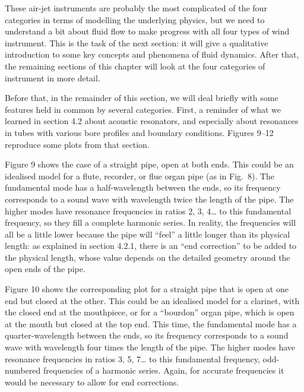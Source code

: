   These air-jet instruments are probably the most complicated of the four 
  categories in terms of modelling the underlying physics, but we need to 
  understand a bit about fluid flow to make progress with all four types of 
  wind instrument. This is the task of the next section: it will give a 
  qualitative introduction to some key concepts and phenomena of fluid 
  dynamics. After that, the remaining sections of this chapter will look at the 
  four categories of instrument in more detail. 


  Before that, in the remainder of this section, we will deal briefly with some 
  features held in common by several categories. First, a reminder of what we 
  learned in section 4.2 about acoustic resonators, and especially about 
  resonances in tubes with various bore profiles and boundary conditions. 
  Figures 9--12 reproduce some plots from that section. 

  Figure 9 shows the case of a straight pipe, open at both ends. This could be 
  an idealised model for a flute, recorder, or flue organ pipe (as in Fig.\ 8). 
  The fundamental mode has a half-wavelength between the ends, so its frequency 
  corresponds to a sound wave with wavelength twice the length of the pipe. The 
  higher modes have resonance frequencies in ratios 2, 3, 4… to this 
  fundamental frequency, so they fill a complete harmonic series. In reality, 
  the frequencies will all be a little lower because the pipe will “feel” a 
  little longer than its physical length: as explained in section 4.2.1, there 
  is an “end correction” to be added to the physical length, whose value 
  depends on the detailed geometry around the open ends of the pipe. 

  Figure 10 shows the corresponding plot for a straight pipe that is open at 
  one end but closed at the other. This could be an idealised model for a 
  clarinet, with the closed end at the mouthpiece, or for a “bourdon” organ 
  pipe, which is open at the mouth but closed at the top end. This time, the 
  fundamental mode has a quarter-wavelength between the ends, so its frequency 
  corresponds to a sound wave with wavelength four times the length of the 
  pipe. The higher modes have resonance frequencies in ratios 3, 5, 7… to this 
  fundamental frequency, odd-numbered frequencies of a harmonic series. Again, 
  for accurate frequencies it would be necessary to allow for end corrections. 

